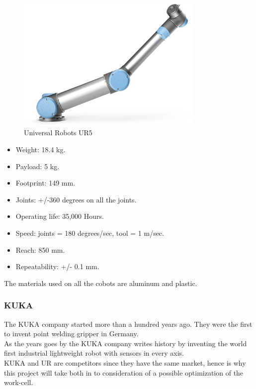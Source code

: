 \begin{figure}[h]
    \centering
    \includegraphics[width=9cm]{UR/UR5pic.jpg}
    \caption{Universal Robots UR5 \cite{UR5billede}}
    \label{fig:UR5}
\end{figure}

\begin{itemize}
    \item Weight: 18.4 kg.
    \item Payload: 5 kg.
    \item Footprint: 149 mm.
    \item Joints: +/-360 degrees on all the joints.
    \item Operating life: 35,000 Hours.
    \item Speed: joints = 180 degrees/sec, tool = 1 m/sec.
    \item Reach: 850 mm.
    \item Repeatability: +/- 0.1 mm.
\end{itemize}
The materials used on all the cobots are aluminum and plastic\cite{Ur5_about}\cite{UR5_tech}.


\subsubsection{KUKA}

The KUKA company started more than a hundred years ago. They were the first to invent point welding gripper in Germany.\\
As the years goes by the KUKA company writes history by inventing the world first industrial lightweight robot with sensors in every axis.\\

KUKA and UR are competitors since they have the same market, hence is why this project will take both in to consideration of a possible optimization of the work-cell\cite{KukaHist}.\\


